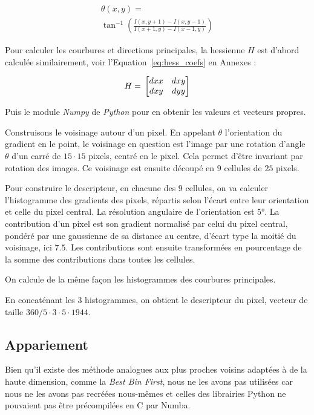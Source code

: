 \documentclass[
	a4paper, %
	10pt, %
	unnumberedsections, %
	twoside, %
]{LTJournalArticle}
\begin{document}
\begin{multline}
	\theta(x, y) = \\
	\tan^{-1}\left(\frac{I(x,y+1)-I(x,y-1)}{I(x+1, y) - I(x-1,y)}\right)
\end{multline}

Pour calculer les courbures et directions principales, la hessienne $H$ est d'abord calculée
similairement, voir l'Equation~\ref{eq:hess_coefs} en Annexes :

\begin{equation}
	H = \\
	\begin{bmatrix}
		dxx & dxy \\
		dxy & dyy
	\end{bmatrix}
\end{equation}

Puis le module \textit{Numpy} de \textit{Python} pour en obtenir les valeurs et vecteurs
propres.



Construisons le voisinage autour d'un pixel. En appelant $\theta$
l'orientation du gradient en le point, le voisinage en question est l'image par
une rotation d'angle $\theta$ d'un carré de $15\cdot 15$ pixels,
centré en le pixel. Cela permet d'être invariant par rotation des images.
Ce voisinage est ensuite découpé en $9$ cellules de $25$ pixels.

Pour construire le descripteur, en chacune des $9$ cellules, on va
calculer l'histogramme des gradients des pixels,
répartis selon l'écart entre leur orientation et celle du pixel central.
La résolution angulaire de l'orientation est $5$°. La contribution d'un pixel
est son gradient normalisé par celui du pixel central, pondéré par une gaussienne
de sa distance au centre, d'écart type la moitié du voisinage, ici $7.5$. Les contributions sont ensuite transformées en pourcentage
de la somme des contributions dans toutes les cellules.

On calcule de la même façon les histogrammes des courbures principales.

En concaténant les $3$ histogrammes, on obtient le descripteur du pixel,
vecteur de taille $360 / 5 \cdot 3 \cdot 5 \cdot 1944$.


\subsection{Appariement}
Bien qu'il existe des méthode analogues aux plus proches voisins adaptées à de la haute dimension,
comme la \textit{Best Bin First}, nous ne les avons pas utilisées car nous ne les avons pas
recréées nous-mêmes et celles des librairies Python ne pouvaient pas être précompilées en C
par Numba.
\end{document}
